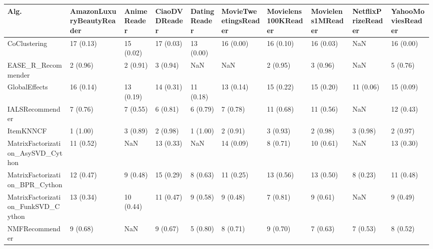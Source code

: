 \begin{tabular}{llllllllll}
\toprule
                               Alg. & AmazonLuxuryBeautyReader & AnimeReader & CiaoDVDReader & DatingReader & MovieTweetingsReader & Movielens100KReader & Movielens1MReader & NetflixPrizeReader & YahooMoviesReader \\
\midrule
                       CoClustering &                17 (0.13) &   15 (0.02) &     17 (0.03) &    13 (0.00) &            16 (0.00) &           16 (0.10) &         16 (0.03) &                NaN &         16 (0.00) \\
                 EASE\_R\_Recommender &                 2 (0.96) &    2 (0.91) &      3 (0.94) &          NaN &                  NaN &            2 (0.95) &          3 (0.96) &                NaN &          5 (0.76) \\
                      GlobalEffects &                16 (0.14) &   13 (0.19) &     14 (0.31) &    11 (0.18) &            13 (0.14) &           15 (0.22) &         15 (0.20) &          11 (0.06) &         15 (0.09) \\
                    IALSRecommender &                 7 (0.76) &    7 (0.55) &      6 (0.81) &     6 (0.79) &             7 (0.78) &           11 (0.68) &         11 (0.56) &                NaN &         12 (0.43) \\
                          ItemKNNCF &                 1 (1.00) &    3 (0.89) &      2 (0.98) &     1 (1.00) &             2 (0.91) &            3 (0.93) &          2 (0.98) &           3 (0.98) &          2 (0.97) \\
  MatrixFactorization\_AsySVD\_Cython &                11 (0.52) &         NaN &     13 (0.33) &          NaN &            14 (0.09) &            8 (0.71) &         10 (0.61) &                NaN &         13 (0.30) \\
     MatrixFactorization\_BPR\_Cython &                12 (0.47) &    9 (0.48) &     15 (0.29) &     8 (0.63) &            11 (0.25) &           13 (0.56) &         13 (0.50) &           8 (0.23) &         11 (0.48) \\
 MatrixFactorization\_FunkSVD\_Cython &                13 (0.34) &   10 (0.44) &     11 (0.47) &     9 (0.58) &             9 (0.48) &            7 (0.81) &          9 (0.61) &                NaN &          9 (0.49) \\
                     NMFRecommender &                 9 (0.68) &         NaN &      9 (0.67) &     5 (0.80) &             8 (0.71) &            9 (0.70) &          7 (0.63) &           7 (0.53) &          8 (0.52) \\

\end{tabular}
